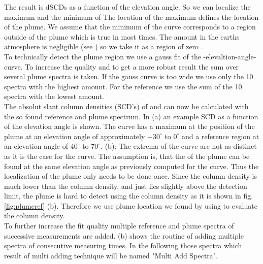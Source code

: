 The result is  dSCDs as a function of the elevation angle. So we can localize the maximum and the minimum of 
The location of the  maximum defines the location of the plume. We assume that the minimum of the  curve corresponds to a region outside of the plume which is true in most times. The  amount in the earths atmosphere is negligible (see  ) so we take it as a region of zero . \\
To technically detect the plume region we use a gauss fit of the -elevaltion-angle-curve.
To increase the quality and to get a more robust result the sum over several plume spectra is taken. If the gauss curve is too wide we use only the 10 spectra with the highest  amount. For the reference we use the sum of the 10 spectra with the lowest  amount.\\
%
The absolut slant column densities (SCD's) of   and  can now be calculated with the so found reference and plume spectrum.
In  (a) an example  SCD as a function of the elevation angle is shown. The  curve has a maximum at the position of the plume at an elevation angle of approximately $-30^{\circ}$ to $0^{\circ}$  and a reference region at an elevation angle of $40^{\circ}$ to $70^{\circ}$.  (b): The extrema of the   curve are not as distinct as it is the case for the  curve. The assumption is, that the   of the plume can be found at the same elevation angle as previously computed for the  curve. Thus the localization of the plume only needs to be done once.
Since the  column density is much lower than the  column density, and just lies slightly above the detection limit, the plume is hard to detect using the  column density as it is shown in fig. \ref{fig:plumeref} (b). 
Therefore we use plume location we found by using  to evaluate the  column density.\\
To further increase the fit quality multiple reference and plume spectra of successive measurements are added.
 (b) shows the routine of adding multiple spectra of consecutive measuring times. In the following those spectra which result of multi adding technique will be named "Multi Add Spectra".\\
